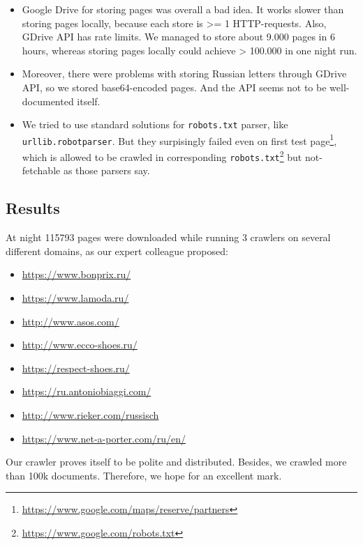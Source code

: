 \documentclass[format=sigconf]{acmart}
\newcommand{\todo}[1]{\textcolor{red}{\textbf{TODO:} #1}}
\begin{document}
\begin{itemize}
\item Google Drive for storing pages was overall a bad idea. It works slower than storing pages locally, because each store is >= 1 HTTP-requests. 
Also, GDrive API has rate limits. We managed to store about 9.000 pages in 6 hours, whereas storing pages locally could achieve > 100.000 in one night run.

\item Moreover, there were problems with storing Russian letters through GDrive API, so we stored base64-encoded pages. And the API seems not to be well-documented itself.

\item We tried to use standard solutions for \texttt{robots.txt} parser, like \texttt{urllib.robotparser}. 
But they surpisingly failed even on first test page\footnote{\url{https://www.google.com/maps/reserve/partners}}, which is allowed to be crawled in corresponding \texttt{robots.txt}\footnote{\url{https://www.google.com/robots.txt}} but not-fetchable as those parsers say. 
\end{itemize}


\subsection{Results}

At night 115793 pages were downloaded while running 3 crawlers on several different domains, as our expert colleague proposed:
\begin{itemize}
    \item \url{https://www.bonprix.ru/}
    \item \url{https://www.lamoda.ru/}
    \item \url{http://www.asos.com/}
    \item \url{http://www.ecco-shoes.ru/}
    \item \url{https://respect-shoes.ru/} %
    \item \url{https://ru.antoniobiaggi.com/} %
    \item \url{http://www.rieker.com/russisch}
    \item \url{https://www.net-a-porter.com/ru/en/}
\end{itemize}

Our crawler proves itself to be polite and distributed. Besides, we crawled more than 100k documents. Therefore, we hope for an excellent mark.
\end{document}
